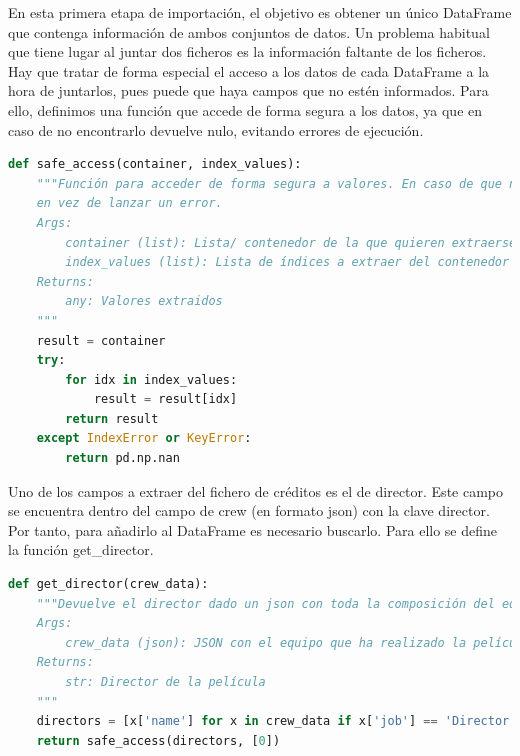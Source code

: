 En esta primera etapa de importación, el objetivo es obtener un único DataFrame que contenga información de ambos conjuntos de datos. Un problema habitual que tiene lugar al juntar dos ficheros es la información faltante de los ficheros. Hay que tratar de forma especial el acceso a los datos de cada DataFrame a la hora de juntarlos, pues puede que haya campos que no estén informados. Para ello, definimos una función que accede de forma segura a los datos, ya que en caso de no encontrarlo devuelve nulo, evitando errores de ejecución.

\begin{lstlisting}[language=Python, caption=Acceso a los datos de forma segura.]
def safe_access(container, index_values):
    """Función para acceder de forma segura a valores. En caso de que no se encuentre uno de ellos, se devuelve NaN
    en vez de lanzar un error.
    Args:
        container (list): Lista/ contenedor de la que quieren extraerse los valores
        index_values (list): Lista de índices a extraer del contenedor
    Returns:
        any: Valores extraidos
    """
    result = container
    try:
        for idx in index_values:
            result = result[idx]
        return result
    except IndexError or KeyError:
        return pd.np.nan
\end{lstlisting}

Uno de los campos a extraer del fichero de créditos es el de director. Este campo se encuentra dentro del campo de crew (en formato json) con la clave director. Por tanto, para añadirlo al DataFrame es necesario buscarlo. Para ello se define la función get\_director.
\begin{lstlisting}[language=Python, caption= Obtención de una lista de directores extraidos del campo crew.]
def get_director(crew_data):
    """Devuelve el director dado un json con toda la composición del equipo de la película.
    Args:
        crew_data (json): JSON con el equipo que ha realizado la película
    Returns:
        str: Director de la película
    """
    directors = [x['name'] for x in crew_data if x['job'] == 'Director']
    return safe_access(directors, [0])
\end{lstlisting}

